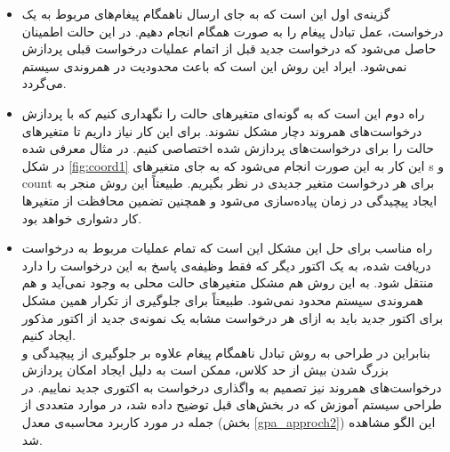 \begin{itemize}
\item گزینه‌ی اول این است که به جای ارسال ناهمگام پیغام‌های مربوط به یک درخواست، عمل تبادل پیغام را به صورت همگام انجام دهیم. در این حالت اطمینان حاصل می‌شود که درخواست جدید قبل از اتمام عملیات درخواست قبلی پردازش نمی‌شود. ایراد این روش این است که باعث محدودیت در همروندی سیستم می‌گردد.
\item راه دوم این است که به گونه‌ای متغیرهای حالت را نگهداری کنیم که با پردازش درخواست‌های همروند دچار مشکل نشوند. برای این کار نیاز داریم تا متغیرهای حالت را برای درخواست‌های پردازش شده اختصاصی کنیم. در مثال معرفی شده در  شکل \ref{fig:coord1} این کار به این صورت انجام می‌شود که به جای متغیر‌های s و count برای هر درخواست متغیر جدیدی در نظر بگیریم. طبیعتاً این روش منجر به ایجاد پیچیدگی در زمان پیاده‌سازی می‌شود و همچنین تضمین محافظت از متغیرها کار دشواری خواهد بود.
\item
 راه مناسب برای حل این مشکل این است که تمام عملیات مربوط به درخواست دریافت شده، به یک اکتور دیگر که فقط وظیفه‌ی پاسخ به این درخواست را دارد منتقل شود. به این روش هم مشکل متغیر‌های حالت محلی به وجود نمی‌آید و هم همروندی سیستم محدود نمی‌شود. طبیعتاً برای جلوگیری از تکرار همین مشکل برای اکتور جدید باید به ازای هر درخواست مشابه یک نمونه‌ی جدید از اکتور مذکور ایجاد کنیم.\\
بنابراین در طراحی به روش تبادل ناهمگام پیغام علاوه‌ بر جلوگیری از پیچیدگی و بزرگ شدن بیش از حد کلاس، ممکن است به دلیل ایجاد امکان پردازش درخواست‌های همروند نیز تصمیم به واگذاری درخواست به اکتوری جدید نماییم.
 در طراحی سیستم آموزش که در بخش‌های قبل توضیح داده شد، در موارد متعددی از جمله در مورد کاربرد محاسبه‌ی معدل (بخش \ref{gpa_approch2}) این الگو مشاهده شد.

\end{itemize}
